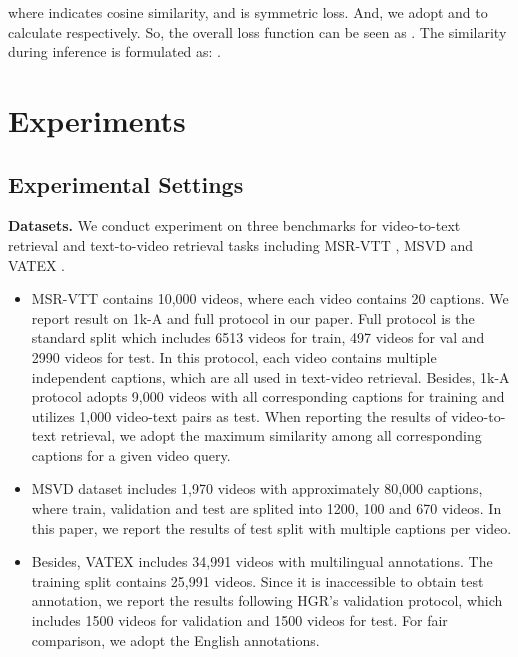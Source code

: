 \documentclass[final]{cvpr}
\begin{document}
where  indicates cosine similarity, and  is symmetric loss.
And, we adopt  and  to calculate  respectively.  So, the overall loss function can be seen as . The similarity during inference is formulated as: .



\section{Experiments}
\subsection{Experimental Settings}
\textbf{Datasets.} We conduct experiment on three benchmarks for  video-to-text retrieval and text-to-video retrieval tasks including MSR-VTT \cite{xu2016msr}, MSVD \cite{chen2011collecting} and VATEX \cite{wang2019vatex}. 
\begin{itemize}
    \item MSR-VTT \cite{xu2016msr} contains 10,000 videos, where each video contains 20 captions. We report result on 1k-A\cite{gabeur2020multi,miech2019howto100m,liu2019use} and full protocol \cite{dzabraev2021mdmmt,luo2020univilm} in our paper. Full protocol \cite{dzabraev2021mdmmt,luo2020univilm} is the standard split which includes 6513 videos for train, 497 videos for val and 2990 videos for test. In this protocol, each video contains multiple independent captions, which are all used in text-video retrieval. Besides, 1k-A protocol adopts 9,000 videos with all corresponding captions for training and utilizes 1,000 video-text pairs as test. When reporting the results of video-to-text retrieval, we adopt the maximum similarity among all corresponding captions for a given video query. 
    \item MSVD \cite{chen2011collecting} dataset includes 1,970 videos with approximately 80,000 captions, where train, validation and test are splited into 1200, 100 and 670 videos. In this paper, we report the results of test split with multiple captions per video.
    \item Besides, VATEX \cite{wang2019vatex} includes 34,991 videos with multilingual annotations. The training split contains 25,991 videos. Since it is inaccessible to obtain test annotation, we report the results following HGR's \cite{chen2020fine} validation protocol, which includes 1500 videos for validation and 1500 videos for test. For fair comparison, we adopt the English annotations.    
\end{itemize}
\end{document}

